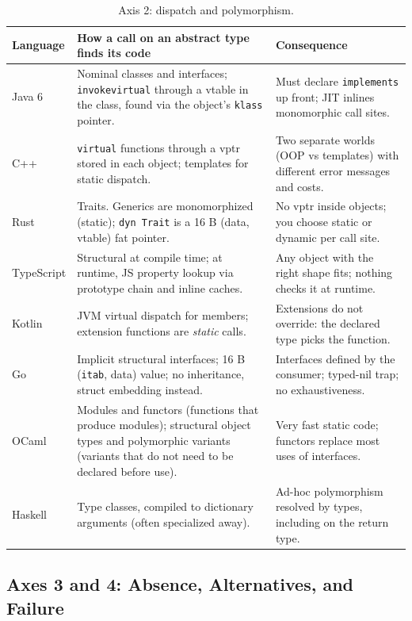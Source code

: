 \begin{table}[H]
\centering
\small
\begin{tabular}{@{}p{1.9cm}p{6.1cm}p{6.3cm}@{}}
\toprule
\textbf{Language} & \textbf{How a call on an abstract type finds its code} & \textbf{Consequence} \\
\midrule
Java 6 & Nominal classes and interfaces; \texttt{invokevirtual} through a vtable in the class, found via the object's \texttt{klass} pointer. & Must declare \texttt{implements} up front; JIT inlines monomorphic call sites. \\
C++ & \texttt{virtual} functions through a vptr stored in each object; templates for static dispatch. & Two separate worlds (OOP vs templates) with different error messages and costs. \\
Rust & Traits. Generics are monomorphized (static); \texttt{dyn Trait} is a 16 B (data, vtable) fat pointer. & No vptr inside objects; you choose static or dynamic per call site. \\
TypeScript & Structural at compile time; at runtime, JS property lookup via prototype chain and inline caches. & Any object with the right shape fits; nothing checks it at runtime. \\
Kotlin & JVM virtual dispatch for members; extension functions are \emph{static} calls. & Extensions do not override: the declared type picks the function. \\
Go & Implicit structural interfaces; 16 B (\texttt{itab}, data) value; no inheritance, struct embedding instead. & Interfaces defined by the consumer; typed-nil trap; no exhaustiveness. \\
OCaml & Modules and functors (functions that produce modules); structural object types and polymorphic variants (variants that do not need to be declared before use). & Very fast static code; functors replace most uses of interfaces. \\
Haskell & Type classes, compiled to dictionary arguments (often specialized away). & Ad-hoc polymorphism resolved by types, including on the return type. \\
\bottomrule
\end{tabular}
\caption{Axis 2: dispatch and polymorphism.}
\label{ch11:tab-dispatch}
\end{table}

\subsection{Axes 3 and 4: Absence, Alternatives, and Failure}

